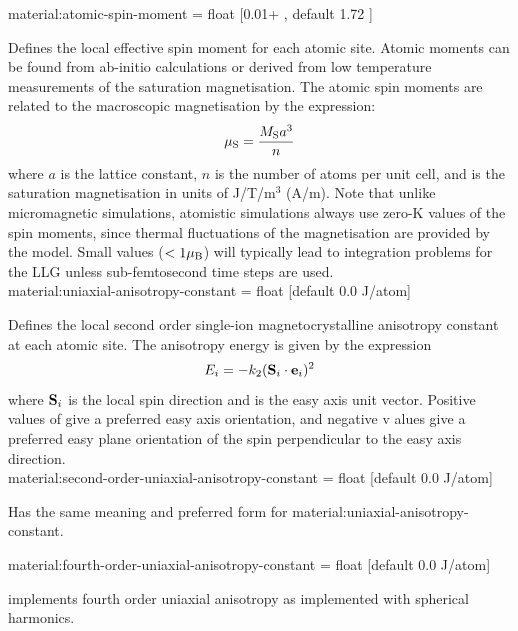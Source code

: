 {\zicf material:atomic-spin-moment = float [0.01+ \muB, default 1.72 \muB]}
Defines the local effective spin moment for each atomic site. Atomic moments can be found from ab-initio calculations or derived from low temperature measurements of the saturation magnetisation. The atomic spin moments are related to the macroscopic magnetisation by the expression:
\begin{equation*}
\mu_\mathrm{S} = \frac{M_\mathrm{S} a^3}{n}
\end{equation*}
where $a$ is the lattice constant, $n$ is the number of atoms per unit cell, and \Ms is the saturation magnetisation in units of J/T/m$^3$ (A/m). Note that unlike micromagnetic simulations, atomistic simulations always use zero-K values of the spin moments, since thermal fluctuations of the magnetisation are provided by the model. Small values ($<1 \mu_\mathrm{B}$) will typically lead to integration problems for the LLG unless sub-femtosecond time steps are used.\\

{\zicf material:uniaxial-anisotropy-constant = float [default 0.0 J/atom]}
  Defines the local second order single-ion magnetocrystalline anisotropy
  constant at each atomic site. The anisotropy energy is given by the expression
\begin{equation*}
E_i = -k_{2} (\mathbf{S}_i \cdot \mathbf{e}_i)^2
\end{equation*}
where $\mathbf{S}_i$ is the local spin direction and \ei is the easy axis unit vector.
Positive values of \kuu give a preferred easy axis orientation, and negative v
alues give a preferred easy plane orientation of the spin perpendicular to the
easy axis direction.\\

{\zicf material:second-order-uniaxial-anisotropy-constant = float [default 0.0 J/atom]}
Has the same meaning and preferred form for material:uniaxial-anisotropy-constant.

{\zicf material:fourth-order-uniaxial-anisotropy-constant = float [default 0.0 J/atom]}
implements fourth order uniaxial anisotropy as implemented with spherical
harmonics.

